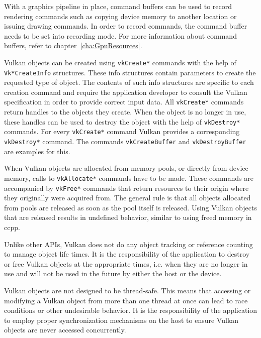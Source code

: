     With a graphics pipeline in place, command buffers can be used to record rendering commands such as copying \gls{device} memory to another location or issuing drawing commands. In order to record commands, the command buffer needs to be set into recording mode. For more information about command buffers, refer to chapter~\ref{cha:GpuResources}.

    Vulkan objects can be created using \lstinline{vkCreate*} commands with the help of \lstinline{Vk*CreateInfo} structures. These info structures contain parameters to create the requested type of object. The contents of such info structures are specific to each creation command and require the \gls{application} developer to consult the Vulkan specification in order to provide correct input data. All \lstinline{vkCreate*} commands return handles to the objects they create. When the object is no longer in use, these handles can be used to destroy the object with the help of \lstinline{vkDestroy*} commands. For every \lstinline{vkCreate*} command Vulkan provides a corresponding \lstinline{vkDestroy*} command. The commands \lstinline{vkCreateBuffer} and \lstinline{vkDestroyBuffer} are examples for this.

    When Vulkan objects are allocated from memory pools, or directly from \gls{device} memory, calls to \lstinline{vkAllocate*} commands have to be made. These commands are accompanied by \lstinline{vkFree*} commands that return resources to their origin where they originally were acquired from. The general rule is that all objects allocated from pools are released as soon as the pool itself is released. Using Vulkan objects that are released results in undefined behavior, similar to using freed memory in \gls{ccpp}.

    Unlike other APIs, Vulkan does not do any object tracking or reference counting to manage object life times. It is the responsibility of the \gls{application} to destroy or free Vulkan objects at the appropriate times, i.e. when they are no longer in use and will not be used in the future by either the \gls{host} or the device.

    Vulkan objects are not designed to be thread-safe. This means that accessing or modifying a Vulkan object from more than one thread at once can lead to race conditions or other undesirable behavior. It is the responsibility of the \gls{application} to employ proper synchronization mechanisms on the \gls{host} to ensure Vulkan objects are never accessed concurrently.

